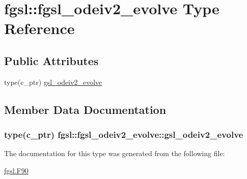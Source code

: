 \hypertarget{structfgsl_1_1fgsl__odeiv2__evolve}{}\section{fgsl\+:\+:fgsl\+\_\+odeiv2\+\_\+evolve Type Reference}
\label{structfgsl_1_1fgsl__odeiv2__evolve}
\subsection*{Public Attributes}
\begin{DoxyCompactItemize}
\item 
type(c\+\_\+ptr) \hyperlink{structfgsl_1_1fgsl__odeiv2__evolve_a6f57a9501060650aca97143be903f7f0}{gsl\+\_\+odeiv2\+\_\+evolve}
\end{DoxyCompactItemize}


\subsection{Member Data Documentation}
\hypertarget{structfgsl_1_1fgsl__odeiv2__evolve_a6f57a9501060650aca97143be903f7f0}{}
\subsubsection[{gsl\+\_\+odeiv2\+\_\+evolve}]{\setlength{\rightskip}{0pt plus 5cm}type(c\+\_\+ptr) fgsl\+::fgsl\+\_\+odeiv2\+\_\+evolve\+::gsl\+\_\+odeiv2\+\_\+evolve}\label{structfgsl_1_1fgsl__odeiv2__evolve_a6f57a9501060650aca97143be903f7f0}


The documentation for this type was generated from the following file\+:\begin{DoxyCompactItemize}
\item 
\hyperlink{fgsl_8F90}{fgsl.\+F90}\end{DoxyCompactItemize}
